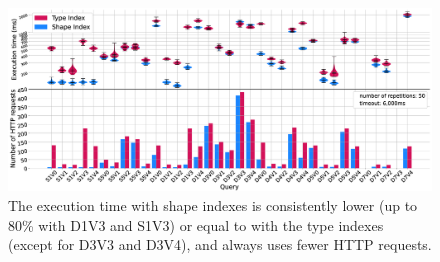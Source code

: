 \begin{figure}
  \centering
  \includegraphics[width=\linewidth]{figure/combined}
  \caption{
  The execution time with shape indexes is consistently lower (up to 80\% with D1V3 and S1V3) or equal to with the type indexes (except for D3V3 and D3V4), and always uses fewer HTTP requests.
  }
  \label{fig:result}
\end{figure}